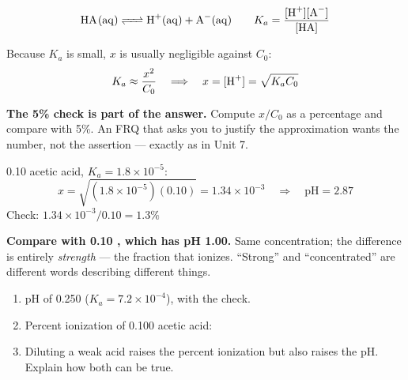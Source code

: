 \documentclass{apchem-notes}
\begin{document}


\[ \ce{HA(aq) <=> H+(aq) + A^-(aq)} \qquad
   K_a = \frac{[\ce{H+}][\ce{A^-}]}{[\ce{HA}]} \]

Because $K_a$ is small, $x$ is usually negligible against $C_0$:
\[ K_a \approx \frac{x^2}{C_0} \quad\Longrightarrow\quad
   x = [\ce{H+}] = \sqrt{K_aC_0} \]

\begin{apctrap}
\textbf{The 5\% check is part of the answer.} Compute $x/C_0$ as a
percentage and compare with 5\%. An FRQ that asks you to justify the
approximation wants the number, not the assertion --- exactly as in Unit 7.
\end{apctrap}

\begin{workedexample}
\SI{0.10}{\Molar} acetic acid, $K_a = 1.8\times10^{-5}$:
\[ x = \sqrt{(1.8\times10^{-5})(0.10)} = 1.34\times10^{-3}
   \quad\Longrightarrow\quad \mathrm{pH} = \mathbf{2.87} \]
Check: $1.34\times10^{-3}/0.10 = 1.3\%$ \checkmark

\textbf{Compare with \SI{0.10}{\Molar} , which has pH 1.00.} Same
concentration; the difference is entirely \emph{strength} --- the fraction
that ionizes. ``Strong'' and ``concentrated'' are different words describing
different things.
\end{workedexample}


\begin{enumerate}[leftmargin=*,itemsep=0.4em]
  \item pH of \SI{0.250}{\Molar}  ($K_a = 7.2\times10^{-4}$),
        with the check. \workspace[2.4cm]
  \item Percent ionization of \SI{0.100}{\Molar} acetic acid:
  \item Diluting a weak acid raises the percent ionization but also raises
        the pH. Explain how both can be true.
\end{enumerate}
\end{document}
